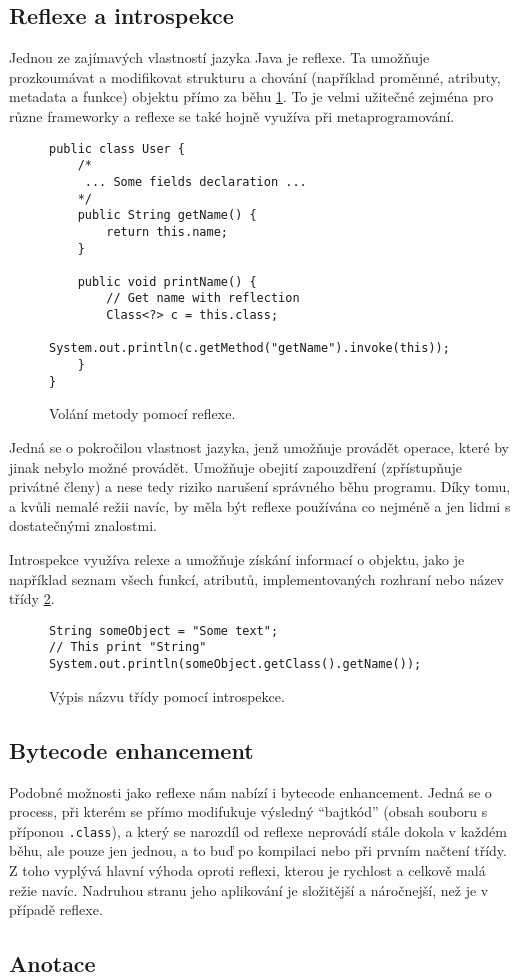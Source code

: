 \subsection{Reflexe a introspekce}
Jednou ze zajímavých vlastností jazyka Java je reflexe. Ta umožňuje prozkoumávat a modifikovat strukturu a chování (například proměnné, atributy, metadata a funkce) objektu přímo za běhu \ref{code:java:reflection}.
To je velmi užitečné zejména pro různe frameworky a reflexe se také hojně využíva při metaprogramování. 
\begin{figure}[!h]
\begin{lstlisting}
public class User {
    /*
     ... Some fields declaration ...
    */
    public String getName() {
        return this.name;
    }
    
    public void printName() {
        // Get name with reflection
        Class<?> c = this.class;
        System.out.println(c.getMethod("getName").invoke(this));
    }
}
\end{lstlisting}
\caption{Volání metody pomocí reflexe.}
\label{code:java:reflection}
\end{figure}

Jedná se o pokročilou vlastnost jazyka, jenž umožňuje provádět operace, které by jinak nebylo možné provádět. Umožňuje obejití zapouzdření (zpřístupňuje privátné členy) a nese tedy riziko narušení správného běhu programu. Díky tomu, a kvůli nemalé režii navíc, by měla být reflexe používána co nejméně a jen lidmi s dostatečnými znalostmi.

Introspekce využíva relexe a umožňuje získání informací o objektu, jako je například seznam všech funkcí, atributů, implementovaných rozhraní nebo název třídy \ref{code:java:introspection}.
\begin{figure}[!h]
\begin{lstlisting}
String someObject = "Some text";
// This print "String"
System.out.println(someObject.getClass().getName());
\end{lstlisting}
\caption{Výpis názvu třídy pomocí introspekce.}
\label{code:java:introspection}
\end{figure}
\subsection{Bytecode enhancement}
Podobné možnosti jako reflexe nám nabízí i bytecode enhancement. Jedná se o process, při kterém se přímo modifukuje výsledný "`bajtkód"' (obsah souboru s příponou \texttt{.class}), a který se narozdíl od reflexe neprovádí stále dokola v každém běhu, ale pouze jen jednou, a to buď po kompilaci nebo při prvním načtení třídy. Z toho vyplývá hlavní výhoda oproti reflexi, kterou je rychlost a celkově malá režie navíc. Nadruhou stranu jeho aplikování je složitější a náročnejší, než je v případě reflexe.


\subsection{Anotace}

 
